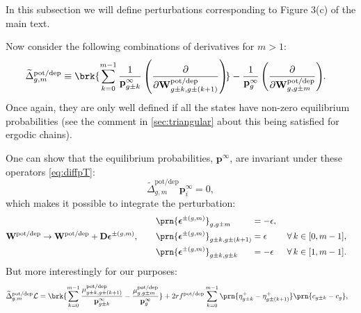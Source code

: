 \documentclass[9pt,twocolumn,twoside,lineno]{pnas-new}
\newcommand{\pdiffc}[3][]{\left(\frac{\partial #2}{\partial {#3}}\right)_{\!\!#1}}
\newcommand{\CL}{\mathcal{L}}
\newcommand{\prob}{\mathbf{p}}
\newcommand{\eq}{\prob^\infty}
\newcommand{\D}{\mathbf{D}}
\newcommand{\W}{\mathbf{W}}
\newcommand{\potdep}{^{\text{pot/dep}}}
\begin{document}
\begin{strip}
In this subsection we will define perturbations corresponding to Figure 3(c) of the main text.

Now consider the following combinations of derivatives for $m>1$:
%
\begin{align}
\label{eq:shortcutderiv}
    \widetilde{\Delta}\potdep _{g,m} &\equiv
      \brk{ \sum_{k=0}^{m-1} \frac{1}{\eq_{g\pm k}} \pdiffc{}{\W\potdep _{g\pm k,g\pm(k+1)}} }
      - \frac{1}{\eq_g} \pdiffc{}{\W\potdep _{g,g\pm m}}.
\end{align}
%
Once again, they are only well defined if all the states have non-zero equilibrium probabilities (see the comment in \cref{sec:triangular} about this being satisfied for ergodic chains).

One can show that the equilibrium probabilities, $\eq$, are invariant under these operators \cref{eq:diffpT}:
%
\begin{equation}\label{eq:shortcutprob}
  \widetilde{\Delta}\potdep _{g,m} \eq_i = 0,
\end{equation}
%
which makes it possible to integrate the perturbation:
%
\begin{equation}\label{eq:shortcutfinite}
  \W\potdep  \to \W\potdep  + \D\boldsymbol{\epsilon}^{\pm(g,m)},
  \qquad
  \begin{aligned}
    &\prn{\boldsymbol{\epsilon}^{\pm(g,m)}}_{g,g\pm m}
      &\!\!\!\!\!\!&= -\epsilon,\\
    &\prn{\boldsymbol{\epsilon}^{\pm(g,m)}}_{g\pm k,g\pm(k+1)}
      &\!\!\!\!\!\!&= \epsilon
        &\;
        &\forall\, k \in [0,m-1],\\
    &\prn{\boldsymbol{\epsilon}^{\pm(g,m)}}_{g\pm k,g\pm k}
      &\!\!\!\!\!\!&= -\epsilon
        &
        &\forall\, k \in [1,m-1].
  \end{aligned}
\end{equation}
%
But more interestingly for our purposes:
%
\begin{align}
\label{eq:shortcutarea}
    \widetilde{\Delta}\potdep _{g,m}\CL &=
      \brk{ \sum_{k=0}^{m-1} \frac{\mu\potdep _{g\pm k,g\pm(k+1)}}{\eq_{g\pm k}}
      - \frac{\mu\potdep _{g,g\pm m}}{\eq_g}}
      + 2rf\potdep  \sum_{k=0}^{m-1} \prn{\eta^+_{g\pm k} - \eta^+_{g\pm(k+1)}} \prn{c_{g\pm k} - c_{g}},
\end{align}
%


\end{strip}
\end{document}
